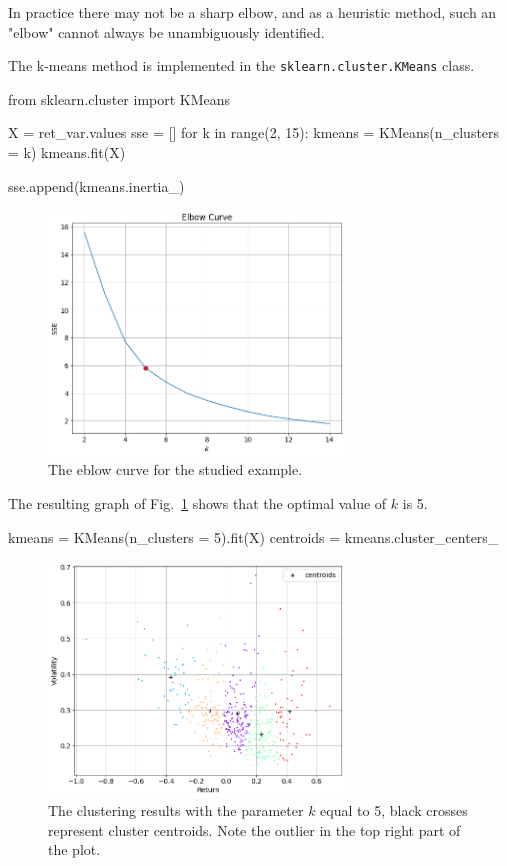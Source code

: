 In practice there may not be a sharp elbow, and as a heuristic method, such an "elbow" cannot always be unambiguously identified.

The k-means method is implemented in the \texttt{sklearn.cluster.KMeans} class.

\begin{ipython} 
from sklearn.cluster import KMeans
 
X =  ret_var.values 
sse = []
for k in range(2, 15):
    kmeans = KMeans(n_clusters = k)
    kmeans.fit(X)
   
    sse.append(kmeans.inertia_) 
\end{ipython}

\begin{figure}
\centering
\includegraphics[width=0.7\textwidth]{figures/elbow_curve}
\caption{The eblow curve for the studied example.}
\label{fig:elbow_curve}
\end{figure}
 
The resulting graph of Fig.~\ref{fig:elbow_curve} shows that the optimal value of $k$ is 5.

\begin{ipython} 
kmeans = KMeans(n_clusters = 5).fit(X)
centroids = kmeans.cluster_centers_
\end{ipython}

\begin{figure}
\centering
\includegraphics[width=0.7\textwidth]{figures/k_means_5}
\caption{The clustering results with the parameter $k$ equal to 5, black crosses represent cluster centroids. Note the outlier in the top right part of the plot.}
\label{fig:K_means_5}
\end{figure}
 
